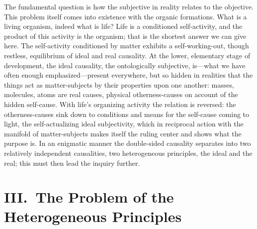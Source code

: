 \documentclass[12pt]{article}
\begin{document}
The fundamental question is how the subjective in reality relates to the
objective. This problem itself comes into existence with the organic
formations. What is a living organism, indeed what is life? Life is a
conditioned self-activity, and the product of this activity is the organism;
that is the shortest answer we can give here. The self-activity conditioned
by matter exhibits a self-working-out, though restless, equilibrium of ideal
and real causality. At the lower, elementary stage of development, the ideal
causality, the ontologically subjective, is—what we have often enough
emphasized—present everywhere, but so hidden in realities that the things
act as matter-subjects by their properties upon one another: masses,
molecules, atoms are real causes, physical otherness-causes on account of
the hidden self-cause. With life's organizing activity the relation is
reversed: the otherness-causes sink down to conditions and means for the
self-cause coming to light, the self-actualizing ideal subjectivity, which
in reciprocal action with the manifold of matter-subjects makes itself the
ruling center and shows what the purpose is. In an enigmatic manner the
double-sided causality separates into two relatively independent
causalities, two heterogeneous principles, the ideal and the real; this must
then lead the inquiry further.


\section*{III.\ The Problem of the Heterogeneous Principles}
\label{sec:ueensartede}
\end{document}
